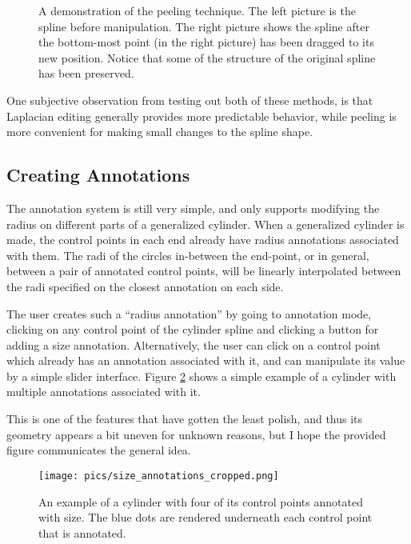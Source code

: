 \documentclass[english]{article}
\begin{document}
\begin{figure}
  \centering
  \qquad

  \caption{A demonstration of the peeling technique. The left picture is the spline before manipulation. The right picture shows the spline after the bottom-most point (in the right picture) has been dragged to its new position. Notice that some of the structure of the original spline has been preserved.}
  \label{fig_peeling}
\end{figure}

One subjective observation from testing out both of these methods, is that Laplacian editing generally provides more predictable behavior, while peeling is more convenient for making small changes to the spline shape.

\subsection{Creating Annotations}

The annotation system is still very simple, and only supports modifying the radius on different parts of a generalized cylinder. When a generalized cylinder is made, the control points in each end already have radius annotations associated with them. The radi of the circles in-between the end-point, or in general, between a pair of annotated control points, will be linearly interpolated between the radi specified on the closest annotation on each side.

The user creates such a ``radius annotation'' by going to annotation mode, clicking on any control point of the cylinder spline and clicking a button for adding a size annotation. Alternatively, the user can click on a control point which already has an annotation associated  with it, and can manipulate its value by a simple slider interface. Figure \ref{fig_annotate} shows a simple example of a cylinder with multiple annotations associated with it.

This is one of the features that have gotten the least polish, and thus its geometry appears a bit uneven for unknown reasons, but I hope the provided figure communicates the general idea.

\begin{figure}
  \centering
  \texttt{[image: pics/size\_annotations\_cropped.png]}

  \caption{An example of a cylinder with four of its control points annotated with size. The blue dots are rendered underneath each control point that is annotated. }
  \label{fig_annotate}
  
\end{figure}
\end{document}
